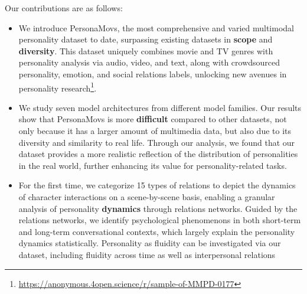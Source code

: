 Our contributions are as follows:
\begin{itemize}
  \item We introduce PersonaMovs, the most comprehensive and varied multimodal personality dataset to date, surpassing existing datasets in \textbf{scope} and \textbf{diversity}. This dataset uniquely combines movie and TV genres with personality analysis via audio, video, and text, along with crowdsourced personality, emotion, and social relations labels, unlocking new avenues in personality research\footnote[2]{\url{https://anonymous.4open.science/r/sample-of-MMPD-0177}}.
  \item We study seven model architectures from different model families. Our results show that PersonaMovs is more \textbf{difficult} compared to other datasets, not only because it has a larger amount of multimedia data, but also due to its diversity and similarity to real life. Through our analysis, we found that our dataset provides a more realistic reflection of the distribution of personalities in the real world, further enhancing its value for personality-related tasks.
  \item For the first time, we categorize 15 types of relations to depict the dynamics of character interactions on a scene-by-scene basis, enabling a granular analysis of personality \textbf{dynamics} through relations networks. Guided by the relations networks, we identify psychological phenomenons in both short-term and long-term conversational contexts, which largely explain the personality dynamics statistically. Personality as fluidity can be investigated  via our dataset, including fluidity across time as well as interpersonal relations
\end{itemize}



